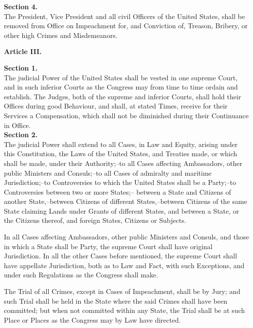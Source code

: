 {\large \textbf{Section 4.}}\\[0.01in]

The President, Vice President and all civil Officers of the United States, shall be removed from Office on Impeachment for, and Conviction of, Treason, Bribery, or other high Crimes and Misdemeanors.\\[0.01in]

\begin{center}
{\Large \textbf{Article III.}}
\end{center}

{\large \textbf{Section 1.}}\\[0.01in]

The judicial Power of the United States shall be vested in one supreme Court, and in such inferior Courts as the Congress may from time to time ordain and establish. The Judges, both of the supreme and inferior Courts, shall hold their Offices during good Behaviour, and shall, at stated Times, receive for their Services a Compensation, which shall not be diminished during their Continuance in Office.\\[0.01in]

{\large \textbf{Section 2.}}\\[0.01in]

The judicial Power shall extend to all Cases, in Law and Equity, arising under this Constitution, the Laws of the United States, and Treaties made, or which shall be made, under their Authority;--to all Cases affecting Ambassadors, other public Ministers and Consuls;--to all Cases of admiralty and maritime Jurisdiction;--to Controversies to which the United States shall be a Party;--to Controversies between two or more States;-- between a State and Citizens of another State,--between Citizens of different States,--between Citizens of the same State claiming Lands under Grants of different States, and between a State, or the Citizens thereof, and foreign States, Citizens or Subjects.

In all Cases affecting Ambassadors, other public Ministers and Consuls, and those in which a State shall be Party, the supreme Court shall have original Jurisdiction. In all the other Cases before mentioned, the supreme Court shall have appellate Jurisdiction, both as to Law and Fact, with such Exceptions, and under such Regulations as the Congress shall make.

The Trial of all Crimes, except in Cases of Impeachment, shall be by Jury; and such Trial shall be held in the State where the said Crimes shall have been committed; but when not committed within any State, the Trial shall be at such Place or Places as the Congress may by Law have directed.\\[0.01in]


